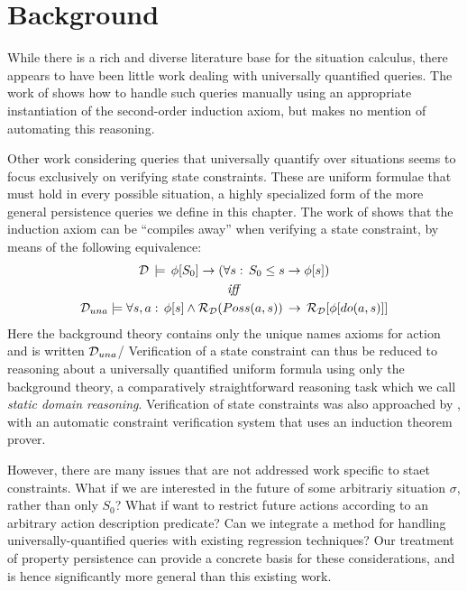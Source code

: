 \section{Background\label{sec:Persistence:Background}}

While there is a rich and diverse literature base for the situation
calculus, there appears to have been little work dealing with universally
quantified queries. The work of \citet{Reiter93proving} shows how
to handle such queries manually using an appropriate instantiation
of the second-order induction axiom, but makes no mention of automating
this reasoning.

Other work considering queries that universally quantify over situations
seems to focus exclusively on verifying state constraints. These are
uniform formulae that must hold in every possible situation, a highly
specialized form of the more general persistence queries we define
in this chapter. The work of \citet{Lin94-StateConstraints} shows
that the induction axiom can be {}``compiles away'' when verifying
a state constraint, by means of the following equivalence:\begin{gather*}
\mathcal{D}\,\models\,\phi[S_{0}]\rightarrow\left(\forall s:\, S_{0}\leq s\rightarrow\phi[s]\right)\\
\mathit{iff}\\
\mathcal{D}_{una}\models\forall s,a:\,\phi[s]\wedge\mathcal{R}_{\mathcal{D}}(Poss(a,s))\,\rightarrow\,\mathcal{R}_{\mathcal{D}}[\phi[do(a,s)]]\end{gather*}
 Here the background theory contains only the unique names axioms
for action and is written $\mathcal{D}_{una}$/ Verification of a state constraint
can thus be reduced to reasoning about a universally quantified uniform
formula using only the background theory, a comparatively straightforward
reasoning task which we call \emph{static domain reasoning}. Verification
of state constraints was also approached by \citet{bertossi96automating},
with an automatic constraint verification system that uses an induction theorem prover.


However, there are many issues that are not addressed work specific
to staet constraints. What if we are interested in the future of some
arbitrariy situation $\sigma$, rather than only $S_{0}$? What if
want to restrict future actions according to an arbitrary action description
predicate? Can we integrate a method for handling universally-quantified
queries with existing regression techniques? Our treatment of property
persistence can provide a concrete basis for these considerations,
and is hence significantly more general than this existing work.

